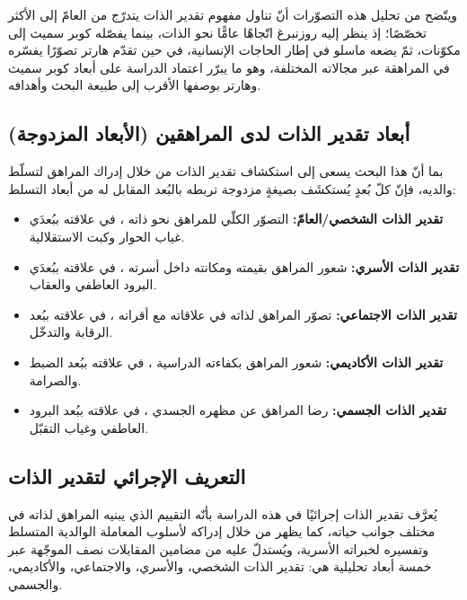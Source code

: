 ويتّضح من تحليل هذه التصوّرات أنّ تناول مفهوم تقدير الذات يتدرّج من العامّ إلى الأكثر تخصّصًا؛ إذ
ينظر إليه روزنبرغ اتّجاهًا عامًّا نحو الذات، بينما يفصّله كوبر سميث إلى مكوّنات، ثمّ يضعه ماسلو في إطار
الحاجات الإنسانية، في حين تقدّم هارتر تصوّرًا يفسّره في المراهقة عبر مجالاته المختلفة، وهو ما يبرّر
اعتماد الدراسة على أبعاد كوبر سميث وهارتر بوصفها الأقرب إلى طبيعة البحث وأهدافه.

\subsection{أبعاد تقدير الذات لدى المراهقين (الأبعاد المزدوجة)}
بما أنّ هذا البحث يسعى إلى استكشاف تقدير الذات من خلال إدراك المراهق لتسلّط والديه، فإنّ كلّ بُعدٍ
يُستكشَف بصيغةٍ مزدوجة تربطه بالبُعد المقابل له من أبعاد التسلط:
\begin{itemize}[leftmargin=1.6em,itemsep=1pt]
\item \textbf{تقدير الذات الشخصي/العامّ:} التصوّر الكلّي للمراهق نحو ذاته ، في
علاقته ببُعدَي غياب الحوار وكبت الاستقلالية.
\item \textbf{تقدير الذات الأسري:} شعور المراهق بقيمته ومكانته داخل أسرته ،
في علاقته ببُعدَي البرود العاطفي والعقاب.
\item \textbf{تقدير الذات الاجتماعي:} تصوّر المراهق لذاته في علاقاته مع أقرانه ، في
علاقته ببُعد الرقابة والتدخّل.
\item \textbf{تقدير الذات الأكاديمي:} شعور المراهق بكفاءته الدراسية ، في علاقته ببُعد الضبط والصرامة.
\item \textbf{تقدير الذات الجسمي:} رضا المراهق عن مظهره الجسدي ، في علاقته ببُعد
البرود العاطفي وغياب التقبّل.
\end{itemize}

\subsection{التعريف الإجرائي لتقدير الذات}
يُعرَّف تقدير الذات إجرائيًا في هذه الدراسة بأنّه التقييم الذي يبنيه المراهق لذاته في مختلف جوانب حياته،
كما يظهر من خلال إدراكه لأسلوب المعاملة الوالدية المتسلط وتفسيره لخبراته الأسرية، ويُستدلّ عليه من
مضامين المقابلات نصف الموجّهة عبر خمسة أبعاد تحليلية هي: تقدير الذات الشخصي، والأسري،
والاجتماعي، والأكاديمي، والجسمي.

